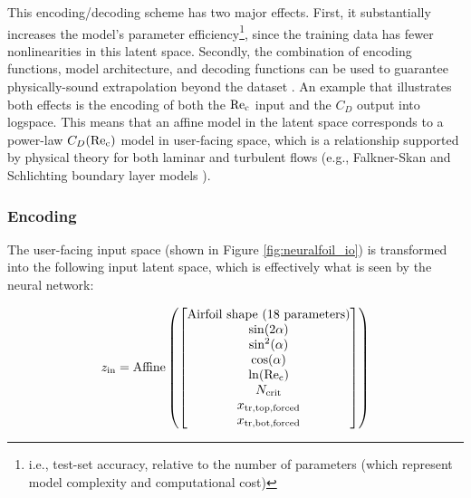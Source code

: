 \documentclass[journal]{new-aiaa}
\begin{document}
This encoding/decoding scheme has two major effects. First, it substantially increases the model's parameter efficiency\footnote{i.e., test-set accuracy, relative to the number of parameters (which represent model complexity and computational cost)}, since the training data has fewer nonlinearities in this latent space. Secondly, the combination of encoding functions, model architecture, and decoding functions can be used to guarantee physically-sound extrapolation beyond the dataset \cite{xuHowNeuralNetworks2021}. An example that illustrates both effects is the encoding of both the $\rm Re_c$ input and the $C_D$ output into logspace. This means that an affine model in the latent space corresponds to a power-law $C_D(\rm Re_c)$ model in user-facing space, which is a relationship supported by physical theory for both laminar and turbulent flows (e.g., Falkner-Skan and Schlichting boundary layer models \cite{drelaAerodynamicsViscousFluids2019}).

\subsubsection{Encoding}

The user-facing input space (shown in Figure \ref{fig:neuralfoil_io}) is transformed into the following input latent space, which is effectively what is seen by the neural network:

\begin{equation}
    z_{\rm in} = \text{Affine}\left( \begin{bmatrix}
            \text{Airfoil shape (18 parameters)} \\
            \sin(2 \alpha)                       \\
            \sin^2(\alpha)                       \\
            \cos(\alpha)                         \\
            \ln(\rm Re_c)                          \\
            N_{\rm crit}                                 \\
            x_{\rm tr, top, forced}              \\
            x_{\rm tr, bot, forced}              \\
        \end{bmatrix} \right)
    \label{eq:encoding}
\end{equation}
\end{document}
